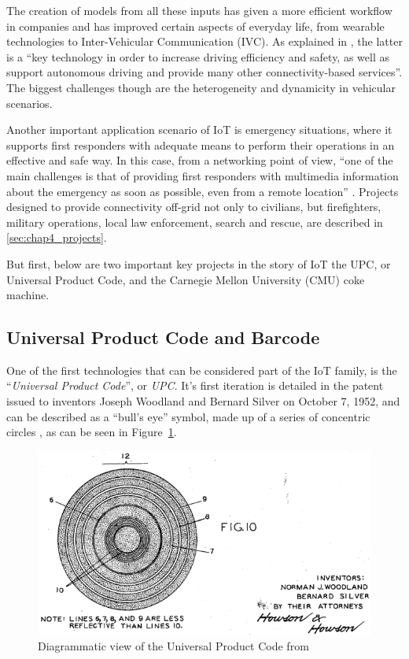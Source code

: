 		The creation of models from all these inputs has given a more efficient workflow in companies and has improved certain aspects of everyday life, from wearable 	technologies to Inter-Vehicular Communication (IVC).
		As explained in \cite{BUJARI2020101204}, the latter is a ``key technology in order to increase driving efficiency and safety, as well as	support autonomous driving and provide many other connectivity-based services''.
		The biggest challenges though are the heterogeneity and dynamicity in vehicular scenarios.
		
		Another important application scenario of IoT is emergency situations, where it supports first responders with adequate means to perform their operations in an effective and safe way.
		In this case, from a networking point of view, ``one of the main challenges is that of providing first responders with multimedia information about the emergency as soon as possible, even from a remote location'' \cite{4197976}.
		Projects designed to provide connectivity off-grid not only to civilians, but firefighters, military operations, local law enforcement, search and rescue, are described in \ref{sec:chap4_projects}.

		But first, below are two important key projects in the story of IoT the UPC, or Universal Product Code, and the Carnegie Mellon University (CMU) coke machine.
		
		\subsection{Universal Product Code and Barcode}
	
			One of the first technologies that can be considered part of the IoT family, is the ``\textit{Universal Product Code}'', or \textit{UPC}.
			It's first iteration is detailed in the patent issued to inventors Joseph Woodland and Bernard Silver on October 7, 1952, and can be described as a ``bull's eye'' symbol, made up of a series of concentric circles \cite{upc_patent}, as can be seen in Figure~\ref{fig:upc_patent}.
			
			\begin{figure}[h]
				\centering
				\includegraphics[width=\textwidth-4cm]{resources/img/upc_1}
				\caption[Diagrammatic view of the Universal Product Code]{Diagrammatic view of the Universal Product Code from \cite{upc_patent}}
				\label{fig:upc_patent}
			\end{figure}
			
